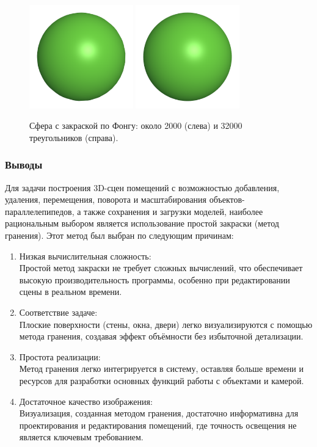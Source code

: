 \begin{figure}[h!]
    \centering
    \includegraphics[width=0.4\textwidth]{img/phong1.png}
    \includegraphics[width=0.4\textwidth]{img/phong2.png}
    \caption{Сфера с закраской по Фонгу: около 2000 (слева) и 32000 треугольников (справа).}
\end{figure}

\subsubsection{Выводы}

\hspace{1.25cm}
Для задачи построения 3D-сцен помещений с возможностью добавления, удаления, перемещения, поворота и масштабирования объектов-параллелепипедов, а также сохранения и загрузки моделей, наиболее рациональным выбором является использование простой закраски (метод гранения). Этот метод был выбран по следующим причинам:

\begin{enumerate}
	\item Низкая вычислительная сложность:\\ Простой метод закраски не требует сложных вычислений, что обеспечивает высокую производительность программы, особенно при редактировании сцены в реальном времени.
	\item Соответствие задаче:\\ Плоские поверхности (стены, окна, двери) легко визуализируются с помощью метода гранения, создавая эффект объёмности без избыточной детализации.
	\item Простота реализации:\\ Метод гранения легко интегрируется в систему, оставляя больше времени и ресурсов для разработки основных функций работы с объектами и камерой.
	\item Достаточное качество изображения:\\ Визуализация, созданная методом гранения, достаточно информативна для проектирования и редактирования помещений, где точность освещения не является ключевым требованием.
\end{enumerate}

